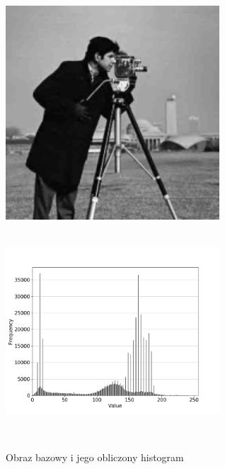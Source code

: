 \documentclass[a4paper,12pt]{book}
\begin{document}
\begin{figure}[H]
	\caption{Obraz bazowy i jego obliczony histogram}
	\includegraphics[width=8cm, height=8cm]{man-unmodified.jpg}
	\includegraphics[width=8cm, height=8cm]{5-1/calculate-photoman.png}
	

\end{figure}
\end{document}
